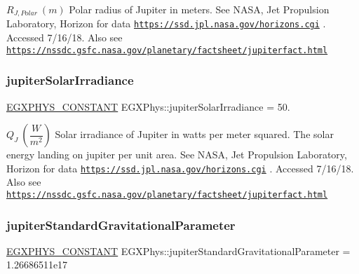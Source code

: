 $R_{J,Polar} \ (m)$ Polar radius of Jupiter in meters. See N\+A\+SA, Jet Propulsion Laboratory, Horizon for data \href{https://ssd.jpl.nasa.gov/horizons.cgi}{\tt https\+://ssd.\+jpl.\+nasa.\+gov/horizons.\+cgi} . Accessed 7/16/18. Also see \href{https://nssdc.gsfc.nasa.gov/planetary/factsheet/jupiterfact.html}{\tt https\+://nssdc.\+gsfc.\+nasa.\+gov/planetary/factsheet/jupiterfact.\+html} \mbox{\label{group___e_g_x_phys-_constants-_astrophysics-_solar_system-_jupiter-_bulk_gaba342d5906a24c551ea5c3328b536b29}} 
\subsubsection{\texorpdfstring{jupiter\+Solar\+Irradiance}{jupiterSolarIrradiance}}
{\footnotesize\ttfamily \mbox{\hyperlink{group___e_g_x_phys-_constants-_macros_ga76980d288494ce1714c9ac68a95ba702}{E\+G\+X\+P\+H\+Y\+S\+\_\+\+C\+O\+N\+S\+T\+A\+NT}} E\+G\+X\+Phys\+::jupiter\+Solar\+Irradiance = 50.}

$ Q_{J} \ (\dfrac{W}{m^2})$ Solar irradiance of Jupiter in watts per meter squared. The solar energy landing on jupiter per unit area. See N\+A\+SA, Jet Propulsion Laboratory, Horizon for data \href{https://ssd.jpl.nasa.gov/horizons.cgi}{\tt https\+://ssd.\+jpl.\+nasa.\+gov/horizons.\+cgi} . Accessed 7/16/18. Also see \href{https://nssdc.gsfc.nasa.gov/planetary/factsheet/jupiterfact.html}{\tt https\+://nssdc.\+gsfc.\+nasa.\+gov/planetary/factsheet/jupiterfact.\+html} \mbox{\label{group___e_g_x_phys-_constants-_astrophysics-_solar_system-_jupiter-_bulk_ga3739c2ca3ea3a5dcbeae071e7e32dc9c}} 
\subsubsection{\texorpdfstring{jupiter\+Standard\+Gravitational\+Parameter}{jupiterStandardGravitationalParameter}}
{\footnotesize\ttfamily \mbox{\hyperlink{group___e_g_x_phys-_constants-_macros_ga76980d288494ce1714c9ac68a95ba702}{E\+G\+X\+P\+H\+Y\+S\+\_\+\+C\+O\+N\+S\+T\+A\+NT}} E\+G\+X\+Phys\+::jupiter\+Standard\+Gravitational\+Parameter = 1.\+26686511e17}

